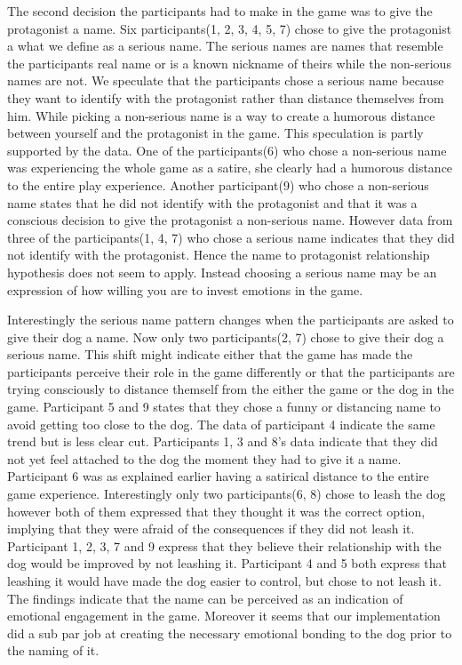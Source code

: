 The second decision the participants had to make in the game was to give the protagonist a name. Six participants(1, 2, 3, 4, 5, 7) chose to give the protagonist a what we define as a serious name. The serious names are names that resemble the participants real name or is a known nickname of theirs while the non-serious names are not. We speculate that the participants chose a serious name because they want to identify with the protagonist rather than distance themselves from him. While picking a non-serious name is a way to create a humorous distance between yourself and the protagonist in the game. This speculation is partly supported by the data. One of the participants(6) who chose a non-serious name was experiencing the whole game as a satire, she clearly had a humorous distance to the entire play experience. Another participant(9) who chose a non-serious name states that he did not identify with the protagonist and that it was a conscious decision to give the protagonist a non-serious name. However data from three of the participants(1, 4, 7) who chose a serious name indicates that they did not identify with the protagonist. Hence the name to protagonist relationship hypothesis does not seem to apply. Instead choosing a serious name may be an expression of how willing you are to invest emotions in the game.

Interestingly the serious name pattern changes when the participants are asked to give their dog a name. Now only two participants(2, 7) chose to give their dog a serious name. This shift might indicate either that the game has made the participants perceive their role in the game differently or that the participants are trying consciously to distance themself from the either the game or the dog in the game. Participant 5 and 9 states that they chose a funny or distancing name to avoid getting too close to the dog. The data of participant 4 indicate the same trend but is less clear cut. Participants 1, 3 and 8's data indicate that they did not yet feel attached to the dog the moment they had to give it a name. Participant 6 was as explained earlier having a satirical distance to the entire game experience.
Interestingly only two participants(6, 8) chose to leash the dog however both of them expressed that they thought it was the correct option, implying that they were afraid of the consequences if they did not leash it. Participant 1, 2, 3, 7 and 9 express that they believe their relationship with the dog would be improved by not leashing it. Participant 4 and 5 both express that leashing it would have made the dog easier to control, but chose to not leash it. The findings indicate that the name can be perceived as an indication of emotional engagement in the game. Moreover it seems that our implementation did a sub par job at creating the necessary emotional bonding to the dog prior to the naming of it.





